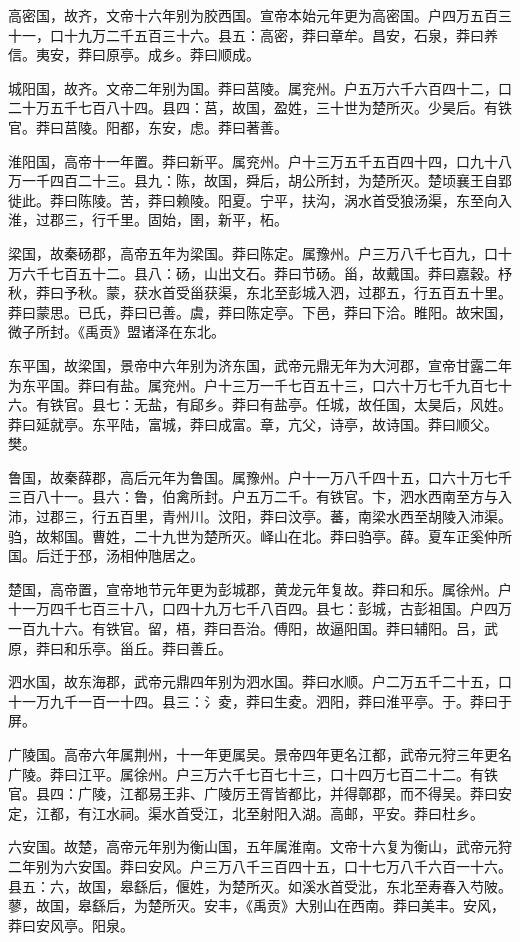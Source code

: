 \documentclass[]{article}
\begin{document}
高密国，故齐，文帝十六年别为胶西国。宣帝本始元年更为高密国。户四万五百三十一，口十九万二千五百三十六。县五：高密，莽曰章牟。昌安，石泉，莽曰养信。夷安，莽曰原亭。成乡。莽曰顺成。

城阳国，故齐。文帝二年别为国。莽曰莒陵。属兖州。户五万六千六百四十二，口二十万五千七百八十四。县四：莒，故国，盈姓，三十世为楚所灭。少昊后。有铁官。莽曰莒陵。阳都，东安，虑。莽曰著善。

淮阳国，高帝十一年置。莽曰新平。属兖州。户十三万五千五百四十四，口九十八万一千四百二十三。县九：陈，故国，舜后，胡公所封，为楚所灭。楚顷襄王自郢徙此。莽曰陈陵。苦，莽曰赖陵。阳夏。宁平，扶沟，涡水首受狼汤渠，东至向入淮，过郡三，行千里。固始，圉，新平，柘。

梁国，故秦砀郡，高帝五年为梁国。莽曰陈定。属豫州。户三万八千七百九，口十万六千七百五十二。县八：砀，山出文石。莽曰节砀。甾，故戴国。莽曰嘉穀。杼秋，莽曰予秋。蒙，获水首受甾获渠，东北至彭城入泗，过郡五，行五百五十里。莽曰蒙思。已氏，莽曰已善。虞，莽曰陈定亭。下邑，莽曰下洽。睢阳。故宋国，微子所封。《禹贡》盟诸泽在东北。

东平国，故梁国，景帝中六年别为济东国，武帝元鼎无年为大河郡，宣帝甘露二年为东平国。莽曰有盐。属兖州。户十三万一千七百五十三，口六十万七千九百七十六。有铁官。县七：无盐，有郈乡。莽曰有盐亭。任城，故任国，太昊后，风姓。莽曰延就亭。东平陆，富城，莽曰成富。章，亢父，诗亭，故诗国。莽曰顺父。樊。

鲁国，故秦薛郡，高后元年为鲁国。属豫州。户十一万八千四十五，口六十万七千三百八十一。县六：鲁，伯禽所封。户五万二千。有铁官。卞，泗水西南至方与入沛，过郡三，行五百里，青州川。汶阳，莽曰汶亭。蕃，南梁水西至胡陵入沛渠。驺，故邾国。曹姓，二十九世为楚所灭。峄山在北。莽曰驺亭。薛。夏车正奚仲所国。后迁于邳，汤相仲虺居之。

楚国，高帝置，宣帝地节元年更为彭城郡，黄龙元年复故。莽曰和乐。属徐州。户十一万四千七百三十八，口四十九万七千八百四。县七：彭城，古彭祖国。户四万一百九十六。有铁官。留，梧，莽曰吾治。傅阳，故逼阳国。莽曰辅阳。吕，武原，莽曰和乐亭。甾丘。莽曰善丘。

泗水国，故东海郡，武帝元鼎四年别为泗水国。莽曰水顺。户二万五千二十五，口十一万九千一百一十四。县三：氵夌，莽曰生夌。泗阳，莽曰淮平亭。于。莽曰于屏。

广陵国。高帝六年属荆州，十一年更属吴。景帝四年更名江都，武帝元狩三年更名广陵。莽曰江平。属徐州。户三万六千七百七十三，口十四万七百二十二。有铁官。县四：广陵，江都易王非、广陵厉王胥皆都比，并得鄣郡，而不得吴。莽曰安定，江都，有江水祠。渠水首受江，北至射阳入湖。高邮，平安。莽曰杜乡。

六安国。故楚，高帝元年别为衡山国，五年属淮南。文帝十六复为衡山，武帝元狩二年别为六安国。莽曰安风。户三万八千三百四十五，口十七万八千六百一十六。县五：六，故国，皋繇后，偃姓，为楚所灭。如溪水首受沘，东北至寿春入芍陂。蓼，故国，皋繇后，为楚所灭。安丰，《禹贡》大别山在西南。莽曰美丰。安风，莽曰安风亭。阳泉。
\end{document}
